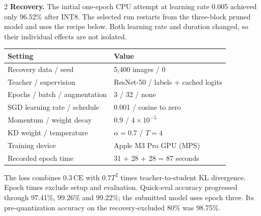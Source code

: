 \documentclass[10pt,letterpaper]{article}
\begin{document}
\begin{multicols}{2}
\noindent\textbf{Recovery.} The initial one-epoch CPU attempt at learning rate 0.005 achieved only 96.52\% after INT8. The selected run restarts from the three-block pruned model and uses the recipe below. Both learning rate and duration changed, so their individual effects are not isolated.
\begin{center}\begin{minipage}{\linewidth}\centering\small\setlength{\tabcolsep}{4pt}
\begin{tabular}{@{}ll@{}}\toprule
\rowcolor{slate}\textbf{Setting} & \textbf{Value}\\\midrule
Recovery data / seed & 5,400 images / 0\\
Teacher / supervision & ResNet-50 / labels + cached logits\\
Epochs / batch / augmentation & 3 / 32 / none\\
SGD learning rate / schedule & 0.001 / cosine to zero\\
Momentum / weight decay & 0.9 / $4\times10^{-5}$\\
KD weight / temperature & $\alpha=0.7$ / $T=4$\\
Training device & Apple M3 Pro GPU (MPS)\\
Recorded epoch time & 31 + 28 + 28 = 87 seconds\\\bottomrule
\end{tabular}\end{minipage}\end{center}
The loss combines $0.3\,\mathrm{CE}$ with $0.7T^2$ times teacher-to-student KL divergence. Epoch times exclude setup and evaluation. Quick-eval accuracy progressed through 97.41\%, 99.26\% and 99.22\%; the submitted model uses epoch three. Its pre-quantization accuracy on the recovery-excluded 80\% was 98.75\%.


\end{multicols}
\end{document}
